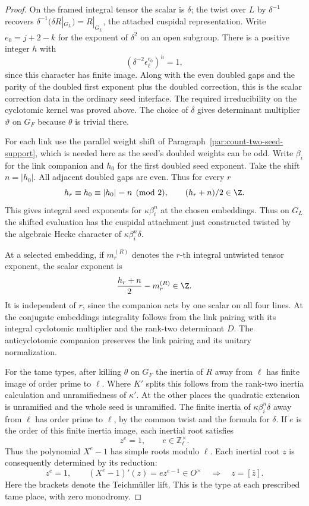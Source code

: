 \begin{proof}
On the framed integral tensor the scalar is \(\delta\);
the twist over \(L\) by \(\delta^{-1}\) recovers
\(\delta^{-1}(\delta R|_{G_L})=R|_{G_L}\), the attached
cuspidal representation. Write \(e_0=j+2-k\)
for the exponent of \(\delta^2\) on an open subgroup.
There is a positive integer \(h\) with
\[
 (\delta^{-2}\epsilon_\ell^{e_0})^h=1,
\]
since this
character has finite image. Along with the even doubled
gaps and the parity of the doubled first exponent plus
the doubled correction, this is the scalar correction data
in the ordinary seed interface. The required irreducibility
on the cyclotomic kernel was proved above. The choice of
\(\delta\) gives determinant multiplier \(\vartheta\) on \(G_F\)
because \(\theta\) is trivial there.

For each link use the parallel weight shift of
Paragraph~\ref{par:count-two-seed-support}, which is
needed here as the seed's doubled weights can be odd.
Write \(\beta_i\) for the link companion and \(h_0\) for
the first doubled seed exponent. Take the shift
\(n=|h_0|\). All adjacent doubled gaps are even. Thus for every \(r\)
\[
 h_r\equiv h_0\equiv |h_0|=n\pmod2,\qquad (h_r+n)/2\in\Z .
\]
This gives integral seed exponents for \(\kappa\beta_i^n\) at the chosen embeddings. Thus on \(G_L\) the shifted
evaluation has the cuspidal attachment just constructed
twisted by the algebraic Hecke character of
\(\kappa\beta_i^n\delta\).

At a selected embedding, if \(m^{(R)}_r\) denotes the
\(r\)-th integral untwisted tensor exponent, the scalar exponent is
\[
             \frac{h_r+n}{2}-m^{(R)}_r\in\Z .
\]
It is independent of \(r\), since the companion acts by one
scalar on all four lines.
At the conjugate embeddings integrality follows from
the link pairing with its integral cyclotomic multiplier
and the rank-two determinant \(D\). The anticyclotomic
companion preserves the link pairing and its unitary
normalization.

For the tame types, after killing \(\theta\) on \(G_F\)
the inertia of \(R\) away from \(\ell\) has finite image of
order prime to \(\ell\). Where \(K'\) splits this follows
from the rank-two inertia calculation and unramifiedness
of \(\kappa'\). At the other places the quadratic extension
is unramified and the whole seed is unramified. The
finite inertia of \(\kappa\beta_i^n\delta\) away from \(\ell\) has
order prime to \(\ell\), by the common twist and the
formula for \(\delta\). If \(e\) is the order of this finite inertia image, each inertial root satisfies
\[
 z^e=1,\qquad e\in\mathbb Z_\ell^\times.
\]
Thus the polynomial \(X^e-1\) has simple roots modulo \(\ell\). Each inertial root \(z\) is consequently determined by its reduction:
\[
 z^e=1,\qquad (X^e-1)'(z)=e z^{e-1}\in O^\times
 \quad\Longrightarrow\quad z=[\bar z].
\]
Here the brackets denote the Teichmüller lift. This is the type at each prescribed
tame place, with zero monodromy.


\end{proof}
